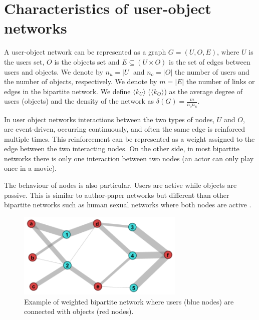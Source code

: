 
\section{Characteristics of user-object networks} \label{sec:ubnetworks}

A user-object network can be represented as a graph $G = (U, O, E)$, where $U$
is the users set, $O$ is the objects set and $E \subseteq (U \times O)$ is the
set of edges between users and objects. We denote by $n_u = |U|$ and $n_o = |O|$
the number of users and the number of objects, respectively. We denote by $m =
|E|$ the number of links or edges in the bipartite network. We define $\langle
k_U \rangle$ ($\langle k_O \rangle$) as the average degree of users (objects)
and the density of the network as $\delta(G) = \frac{m}{n_o n_u}$.

In user object networks interactions between the two types of nodes, $U$ and
$O$, are event-driven, occurring continuously, and often the same edge is
reinforced multiple times. This reinforcement can be represented as a weight
assigned to the edge between the two interacting nodes. On the other side, in
most bipartite networks there is only one interaction between two nodes (an
actor can only play once in a movie).

The behaviour of nodes is also particular. Users are active while objects are
passive. This is similar to author-paper networks but different than other
bipartite networks such as human sexual networks where both nodes are active
\citep{shang10empirical}.

\begin{figure}[t]
\centering
  \includegraphics[width=8cm]{./figures/example_weighted.png}  
  \caption{Example of weighted bipartite network where users (blue nodes) are
  connected with objects (red nodes).
  }
\label{fig:example}
\end{figure}

